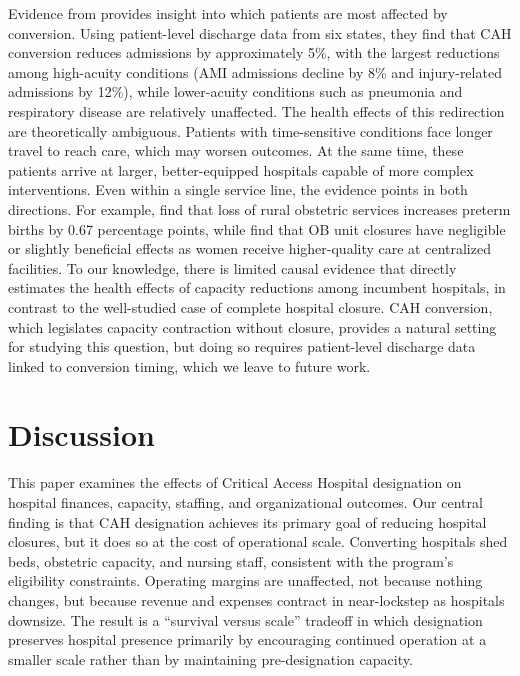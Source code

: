 \documentclass[a4paper, 12pt, twoside]{article}
\begin{document}
Evidence from \cite{gowrisankaran2018} provides insight into which patients are most affected by conversion. Using patient-level discharge data from six states, they find that CAH conversion reduces admissions by approximately 5\%, with the largest reductions among high-acuity conditions (AMI admissions decline by 8\% and injury-related admissions by 12\%), while lower-acuity conditions such as pneumonia and respiratory disease are relatively unaffected. The health effects of this redirection are theoretically ambiguous. Patients with time-sensitive conditions face longer travel to reach care, which may worsen outcomes. At the same time, these patients arrive at larger, better-equipped hospitals capable of more complex interventions. Even within a single service line, the evidence points in both directions. For example, \cite{kozhimannil2018} find that loss of rural obstetric services increases preterm births by 0.67 percentage points, while \cite{fischer2024} find that OB unit closures have negligible or slightly beneficial effects as women receive higher-quality care at centralized facilities. To our knowledge, there is limited causal evidence that directly estimates the health effects of capacity reductions among incumbent hospitals, in contrast to the well-studied case of complete hospital closure. CAH conversion, which legislates capacity contraction without closure, provides a natural setting for studying this question, but doing so requires patient-level discharge data linked to conversion timing, which we leave to future work.


\section{Discussion}
\label{sec:conclusions}

This paper examines the effects of Critical Access Hospital designation on hospital finances, capacity, staffing, and organizational outcomes. Our central finding is that CAH designation achieves its primary goal of reducing hospital closures, but it does so at the cost of operational scale. Converting hospitals shed beds, obstetric capacity, and nursing staff, consistent with the program's eligibility constraints. Operating margins are unaffected, not because nothing changes, but because revenue and expenses contract in near-lockstep as hospitals downsize. The result is a ``survival versus scale'' tradeoff in which designation preserves hospital presence primarily by encouraging continued operation at a smaller scale rather than by maintaining pre-designation capacity.
\end{document}
